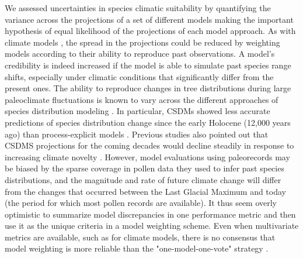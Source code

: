 \documentclass[letterpaper,8pt]{extarticle}  %
\begin{document}
\begin{doublespacing}
\begin{linenumbers}
We assessed uncertainties in species climatic suitability by quantifying the variance across the projections of a set of different models making the important hypothesis of equal likelihood of the projections of each model approach. As with climate models \citep{IPCC2021}, the spread in the projections could be reduced by weighting models according to their ability to reproduce past observations. A model’s credibility is indeed increased if the model is able to simulate past species range shifts, especially under climatic conditions that significantly differ from the present ones. The ability to reproduce changes in tree distributions during large paleoclimate fluctuations is known to vary across the different approaches of species distribution modeling \citep{VanderMeersch2024}. In particular, CSDMs showed less accurate predictions of species distribution change since the early Holocene (12,000 years ago) than process-explicit models \citep{VanderMeersch2024}. Previous studies also pointed out that CSDMS projections for the coming decades would decline steadily  in response to increasing climate novelty \citep{Fitzpatrick2018}. However, model evaluations using paleorecords may be biased by the sparse coverage in pollen data they used to infer past species distributions, and the magnitude and rate of future climate change will differ from the changes that occurred between the Last Glacial Maximum and today (the period for which most pollen records are available). 
It thus seem overly optimistic to summarize model discrepancies in one performance metric and then use it as the unique criteria in a model weighting scheme. Even when multivariate metrics are available, such as for climate models, there is no consensus that model weighting is more reliable than the "one-model-one-vote" strategy \citep{IPCC2022}.


\end{linenumbers}
\end{doublespacing}
\end{document}
